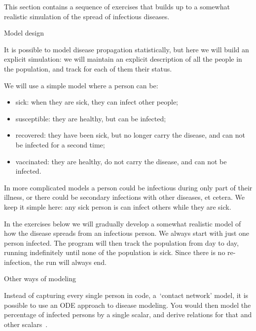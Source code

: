 
This section contains a sequence of exercises that builds up to a
somewhat realistic simulation of the spread of infectious
diseases. 

 {Model design}

It is possible to model disease propagation statistically, but here we
will build an explicit simulation: we will maintain an explicit
description of all
the people in the population, and track for each of them their status.

We will use a simple model where a person can be:
\begin{itemize}
\item sick: when they are sick, they can infect other people;
\item susceptible: they are healthy, but can be infected;
\item recovered: they have been sick, but no longer carry the disease,
  and can not be infected for a second time;
\item vaccinated: they are healthy, do not carry the disease, and can
  not be infected.
\end{itemize}
In more complicated models a person could be infectious during only
part of their illness, or there could be secondary infections with
other diseases, et cetera. We keep it simple here:
any sick person is can infect others while they are sick.

In the exercises below we will gradually develop a somewhat realistic
model of how the disease spreads from an infectious person. We always
start with just one person infected.
The program will then track the population from day to day,
running indefinitely until none of the population
is sick. Since there is no re-infection, the run will always end.

 {Other ways of modeling}

Instead of capturing every single person in code, a~`contact network'
model,
it is possible to use an
\ac{ODE} approach to disease modeling. You would then model the
percentage of infected persons by a single scalar, and derive
relations for that and other scalars~\cite{Anderson:population1979}.

